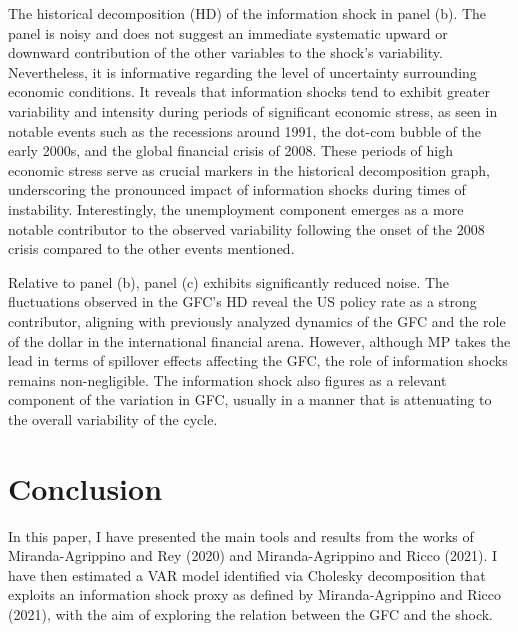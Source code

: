 \documentclass[11pt,a4paper]{article}
\begin{document}
The historical decomposition (HD) of the information shock in panel (b).
The panel is noisy and does not suggest an immediate systematic upward or downward contribution of the other variables to the shock's variability. 
Nevertheless, it is informative regarding the level of uncertainty surrounding economic conditions. 
It reveals that information shocks tend to exhibit greater variability and intensity during periods of significant economic stress, as seen in notable events such as the recessions around 1991, the dot-com bubble of the early 2000s, and the global financial crisis of 2008. These periods of high economic stress serve as crucial markers in the historical decomposition graph, underscoring the pronounced impact of information shocks during times of instability.
Interestingly, the unemployment component emerges as a more notable contributor to the observed variability following the onset of the 2008 crisis compared to the other events mentioned. %




Relative to panel (b), panel (c) exhibits significantly reduced noise. 
The fluctuations observed in the GFC's HD reveal the US policy rate as a strong contributor, aligning with previously analyzed dynamics of the GFC and the role of the dollar in the international financial arena. 
However, although MP takes the lead in terms of spillover effects affecting the GFC, the role of information shocks remains non-negligible.
The information shock also figures as a relevant component of the variation in GFC, usually in a manner that is attenuating to the overall variability of the cycle. %


\section{Conclusion}
In this paper, I have presented the main tools and results from the works of Miranda-Agrippino and Rey (2020) and Miranda-Agrippino and Ricco (2021). I have then estimated a VAR model identified via Cholesky decomposition that exploits an information shock proxy as defined by Miranda-Agrippino and Ricco (2021), with the aim of exploring the relation between the GFC and the shock.
\end{document}
